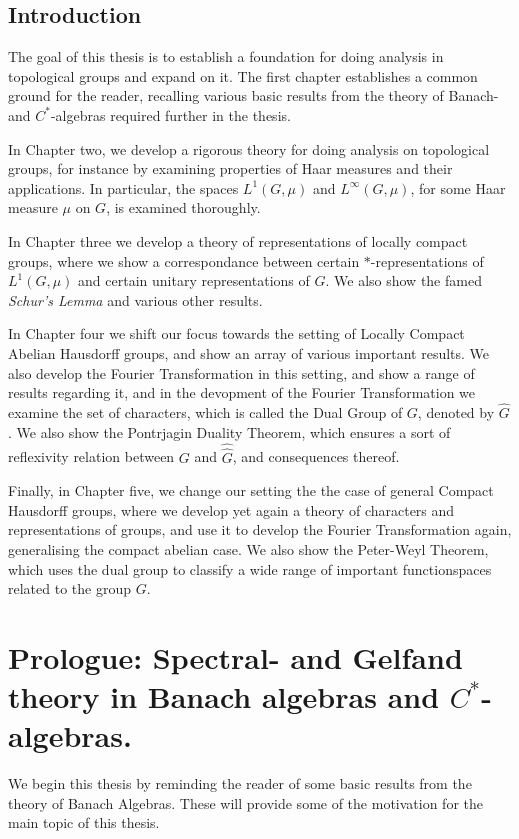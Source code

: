 \documentclass[10pt,twoside,openany,final]{memoir}
\theoremstyle{definition}
\theoremstyle{Break}
\newcommand{\G}{\widehat{G}}
\begin{document}

\newpage

\begin{KeepFromToc}
\chapter*{Introduction}
The goal of this thesis is to establish a foundation for doing analysis in topological groups and expand on it. The first chapter establishes a common ground for the reader, recalling various basic results from the theory of Banach- and $C^*$-algebras required further in the thesis.

In Chapter two, we develop a rigorous theory for doing analysis on topological groups, for instance by examining properties of Haar measures and their applications. In particular, the spaces $L^1(G,\mu)$ and $L^\infty(G,\mu)$, for some Haar measure $\mu$ on $G$, is examined thoroughly.

In Chapter three we develop a theory of representations of locally compact groups, where we show a correspondance between certain $*$-representations of $L^1(G,\mu)$ and certain unitary representations of $G$. We also show the famed \textit{Schur's Lemma} and various other results.

In Chapter four we shift our focus towards the setting of Locally Compact Abelian Hausdorff groups, and show an array of various important results. We also develop the Fourier Transformation in this setting, and show a range of results regarding it, and in the devopment of the Fourier Transformation we examine the set of characters, which is called the Dual Group of $G$, denoted by $\G$. We also show the Pontrjagin Duality Theorem, which ensures a sort of reflexivity relation between $G$ and $\widehat \G$, and consequences thereof.

Finally, in Chapter five, we change our setting the the case of general Compact Hausdorff groups, where we develop yet again a theory of characters and representations of groups, and use it to develop the Fourier Transformation again, generalising the compact abelian case. We also show the Peter-Weyl Theorem, which uses the dual group to classify a wide range of important functionspaces related to the group $G$.

	  \tableofcontents
\end{KeepFromToc}


\chapter{Prologue: Spectral- and Gelfand theory in Banach algebras and $C^*$-algebras.}
We begin this thesis by reminding the reader of some basic results from the theory of Banach Algebras. These will provide some of the motivation for the main topic of this thesis.
\end{document}
